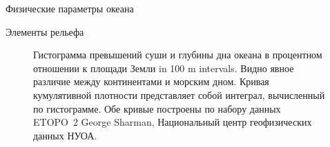 \begin{chapter}{Физические параметры океана}
\begin{section}{Элементы рельефа}
\begin{figure}[t!]
\caption{Гистограмма превышений суши и глубины дна океана в процентном 
отношении к площади Земли in 100 m intervals. Видно явное различие между
континентами и морским дном. Кривая кумулятивной плотности представляет собой
интеграл, вычисленный по гистограмме. Обе кривые построены по набору данных
ETOPO~2 George Sharman, Национальный центр геофизических данных НУОА.} 
\label{fig:depth-r}
\end{figure}
%


\end{section}
\end{chapter}
